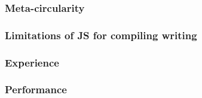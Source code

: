 \begin{frame}
\frametitle{\bf Meta-circularity}

\end{frame}

\begin{frame}
\frametitle{\bf Limitations of JS for compiling writing}

\end{frame}

\begin{frame}
\frametitle{\bf Experience}

\end{frame}

\begin{frame}
\frametitle{\bf Performance}

\end{frame}

